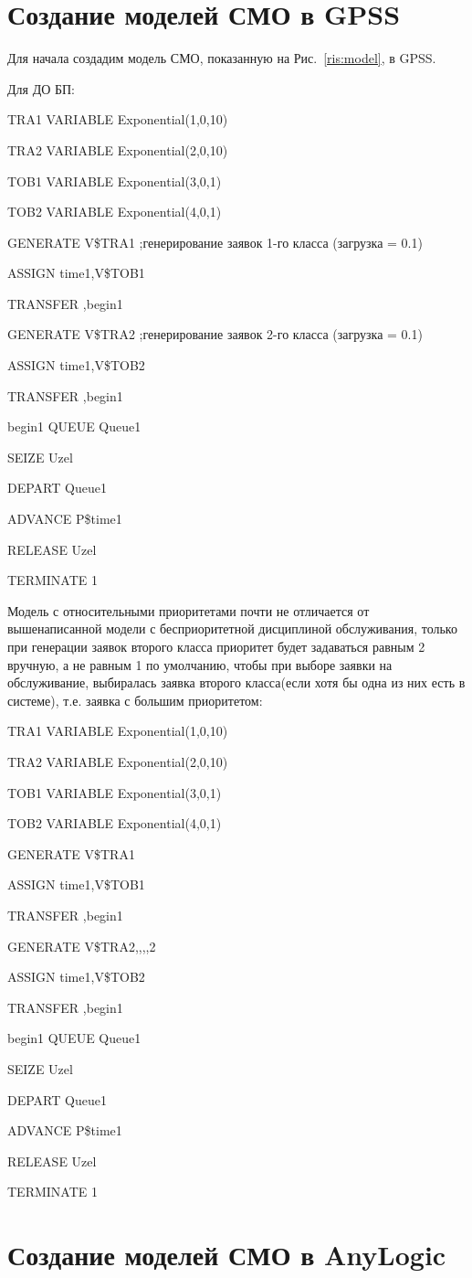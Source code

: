 \documentclass[a4paper,14pt]{report} %
\begin{document}
\section{Создание моделей СМО в GPSS}
Для начала создадим модель СМО, показанную на Рис.~\ref{ris:model}, в GPSS.

Для ДО БП:\par\noindent
TRA1	VARIABLE	Exponential(1,0,10) \par\noindent
TRA2	VARIABLE	Exponential(2,0,10) \par\noindent
TOB1	VARIABLE	Exponential(3,0,1) \par\noindent
TOB2	VARIABLE	Exponential(4,0,1)  \par              
GENERATE	V\$TRA1 ;генерирование заявок 1-го класса (загрузка = 0.1)\par 
ASSIGN 	time1,V\$TOB1 \par
TRANSFER ,begin1 \par
GENERATE	V\$TRA2 ;генерирование заявок 2-го класса (загрузка = 0.1)\par 
ASSIGN 	time1,V\$TOB2 \par
TRANSFER ,begin1 \par\noindent
begin1	QUEUE	Queue1 \par
SEIZE 	Uzel \par
DEPART	Queue1 \par
ADVANCE 	P\$time1 \par
RELEASE 	Uzel \par
TERMINATE 1 \par
\vspace{0.5cm} 
Модель с относительными приоритетами почти не отличается от вышенаписанной модели с бесприоритетной дисциплиной обслуживания, только при генерации заявок второго класса приоритет будет задаваться равным 2 вручную, а не равным 1 по умолчанию, чтобы при выборе заявки на обслуживание, выбиралась заявка второго класса(если хотя бы одна из них есть в системе), т.е. заявка с большим приоритетом:\par\noindent
TRA1	VARIABLE	Exponential(1,0,10) \par\noindent
TRA2	VARIABLE	Exponential(2,0,10) \par\noindent
TOB1	VARIABLE	Exponential(3,0,1) \par\noindent
TOB2	VARIABLE	Exponential(4,0,1)  \par              
GENERATE	V\$TRA1 \par 
ASSIGN 	time1,V\$TOB1 \par
TRANSFER ,begin1 \par
GENERATE	V\$TRA2,,,,2 \par 
ASSIGN 	time1,V\$TOB2 \par
TRANSFER ,begin1 \par\noindent
begin1	QUEUE	Queue1 \par
SEIZE 	Uzel \par
DEPART	Queue1 \par
ADVANCE 	P\$time1 \par
RELEASE 	Uzel \par
TERMINATE 1 \par
\section{Создание моделей СМО в AnyLogic}
\end{document}
